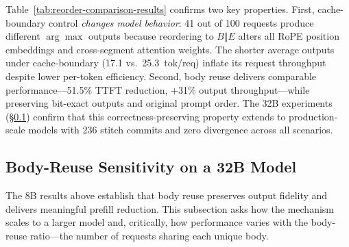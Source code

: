 \documentclass[conference]{IEEEtran}
\begin{document}
Table~\ref{tab:reorder-comparison-results} confirms two key properties. First, cache-boundary control \emph{changes model behavior}: 41 out of 100 requests produce different $\arg\max$ outputs because reordering to $B \Vert E$ alters all RoPE position embeddings and cross-segment attention weights. The shorter average outputs under cache-boundary (17.1 vs.\ 25.3~tok/req) inflate its request throughput despite lower per-token efficiency. Second, body reuse delivers comparable performance---51.5\% TTFT reduction, +31\% output throughput---while preserving bit-exact outputs and original prompt order. The 32B experiments (\S\ref{sec:body-reuse-sensitivity}) confirm that this correctness-preserving property extends to production-scale models with 236 stitch commits and zero divergence across all scenarios.

\subsection{Body-Reuse Sensitivity on a 32B Model}
\label{sec:body-reuse-sensitivity}

The 8B results above establish that body reuse preserves output fidelity and delivers meaningful prefill reduction. This subsection asks how the mechanism scales to a larger model and, critically, how performance varies with the body-reuse ratio---the number of requests sharing each unique body.
\end{document}
